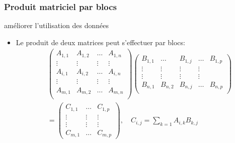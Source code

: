 \begin{frame}
    \frametitle{Produit matriciel par blocs}
\begin{block}{améliorer l'utilisation des données}
   \begin{itemize}
    \item<+-> Le produit de deux matrices peut s'effectuer par blocs:
    \begin{equation}
        \label{eq:produit_bloc}
        \begin{split}
         & \begin{pmatrix}
            A_{1,1} & A_{1,2} & \ldots & A_{1,n} \\
            \vdots & \vdots & \vdots & \vdots \\
            A_{i,1} & A_{i,2} & \ldots & A_{i,n} \\
            \vdots & \vdots & \vdots & \vdots \\
            A_{m,1} & A_{m,2} & \ldots & A_{m,n} \\
        \end{pmatrix}
        \begin{pmatrix}
            B_{1,1}  & \ldots & B_{1,j} & \ldots & B_{1,p} \\
            \vdots & \vdots & \vdots & \vdots \\
            \vdots & \vdots & \vdots & \vdots \\
            B_{n,1} & B_{n,2} & B_{n,j} & \ldots & B_{n,p} \\
        \end{pmatrix} \\
        & = \begin{pmatrix}
            C_{1,1} & \ldots & C_{1,p} \\
            \vdots & \vdots & \vdots \\
            \vdots & \vdots & \vdots \\
            C_{m,1} & \ldots & C_{m,p}
        \end{pmatrix}, \quad C_{i,j} = \sum_{k=1} A_{i,k} B_{k,j}
        \end{split}
    \end{equation}
   \end{itemize}
\end{block}
\end{frame}


